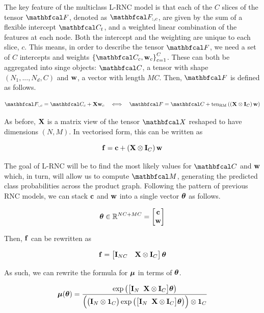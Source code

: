 The key feature of the multiclass L-RNC model is that each of the $C$ slices of the tensor $\Ft$, denoted as $\Ft_{:, c}$, are given by the sum of a flexible intercept $\Ct_t$, and a weighted linear combination of the features at each node. Both the intercept and the weighting are unique to each slice, $c$. This means, in order to describe the tensor $\Ft$, we need a set of $C$ intercepts and weights $\left\{\Ct_c, \w_c\right\}_{c=1}^C$. These can both be aggregated into singe objects: $\Ct$, a tensor with shape $(N_1, ..., N_d, C)$ and $\mathbf{w}$, a vector with length $MC$. Then, $\Ft$ is defined as follows. 

\begin{equation}
     \Ft_{:, c} = \Ct_c + \X \w_c \quad \Longleftrightarrow \quad  \Ft = \Ct + \tenrm{\left(\X \otimes \I_C \right) \w}
\end{equation}

As before, $\mathbf{X}$ is a matrix view of the tensor $\Xt$ reshaped to have dimensions $(N, M)$. In vectorised form, this can be written as 

\begin{equation}
    \mathbf{f} = \mathbf{c} + \left(\mathbf{X} \otimes \mathbf{I}_C \right) \mathbf{w}
\end{equation}
    
The goal of L-RNC will be to find the most likely values for $\Ct$ and $\mathbf{w}$ which, in turn, will allow us to compute $\Mt$, generating the predicted class probabilities across the product graph. Following the pattern of previous RNC models, we can stack $\mathbf{c}$ and $\mathbf{w}$ into a single vector $\boldsymbol{\theta}$ as follows. 

\begin{equation}
    \boldsymbol{\theta} \in \mathbb{R}^{NC + MC} = \begin{bmatrix}
        \mathbf{c} \\ \mathbf{w}
    \end{bmatrix}
\end{equation}

Then, $\mathbf{f}$ can be rewritten as 

\begin{equation}
    \mathbf{f} = \begin{bmatrix}
        \mathbf{I}_{NC} & \mathbf{X} \otimes \mathbf{I}_C 
    \end{bmatrix} \boldsymbol{\theta}
\end{equation}

As such, we can rewrite the formula for $\boldsymbol{\mu}$ in terms of $\boldsymbol{\theta}$. 

\begin{equation}
 \boldsymbol{\mu}(\boldsymbol{\theta}) = \frac{\exp\left(\big[\mathbf{I}_N \;\; \mathbf{X} \otimes \mathbf{I}_C \big] \boldsymbol{\theta}\right)}{ \Big( \big(\mathbf{I}_N \otimes \mathbf{1}_C\big) \exp\big(\big[\mathbf{I}_N \;\; \mathbf{X} \otimes \mathbf{I}_C\big] \boldsymbol{\theta}\big)\Big) \otimes \mathbf{1}_C}
\end{equation}

